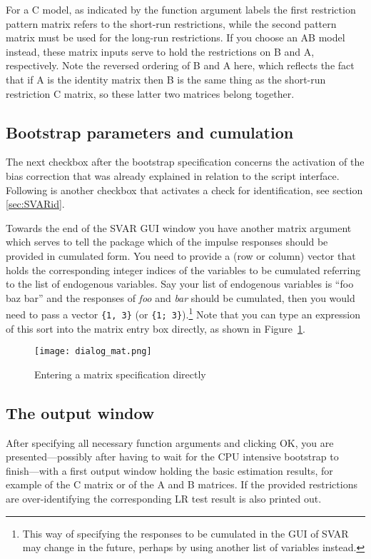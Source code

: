 \documentclass[a4paper,10pt]{article}
\newcounter{script}[section]
\begin{document}
For a C model, as indicated by the function argument labels the first
restriction pattern matrix refers to the short-run restrictions, while
the second pattern matrix must be used for the long-run
restrictions. If you choose an AB model instead, these matrix inputs
serve to hold the restrictions on B and A, respectively. Note the
reversed ordering of B and A here, which reflects the fact that if A
is the identity matrix then B is the same thing as the short-run
restriction C matrix, so these latter two matrices belong together.

\subsection{Bootstrap parameters and cumulation}

The next checkbox after the bootstrap specification concerns the
activation of the bias correction that was already explained in
relation to the script interface. Following is another checkbox that
activates a check for identification, see section \ref{sec:SVARid}.

Towards the end of the SVAR GUI window you have another matrix
argument which serves to tell the package which of the impulse
responses should be provided in cumulated form. You need to provide a
(row or column) vector that holds the corresponding integer indices of
the variables to be cumulated referring to the list of endogenous
variables. Say your list of endogenous variables is ``foo baz bar''
and the responses of \emph{foo} and \emph{bar} should be cumulated,
then you would need to pass a vector \texttt{\{1, 3\}} (or
\texttt{\{1; 3\}}).\footnote{This way of specifying the responses to
  be cumulated in the GUI of SVAR may change in the future, perhaps by
  using another list of variables instead.} Note that you can type an
expression of this sort into the matrix entry box directly, as shown in
Figure~\ref{fig:matrix-entry}.

\begin{figure}[htbp]
  \centering
  \texttt{[image: dialog\_mat.png]}
  \caption{Entering a matrix specification directly}
  \label{fig:matrix-entry}
\end{figure}

\subsection{The output window}

After specifying all necessary function arguments and clicking OK, you
are presented---possibly after having to wait for the CPU intensive
bootstrap to finish---with a first output window holding the basic
estimation results, for example of the C matrix or of the A and B
matrices. If the provided restrictions are over-identifying the
corresponding LR test result is also printed out.
\end{document}
